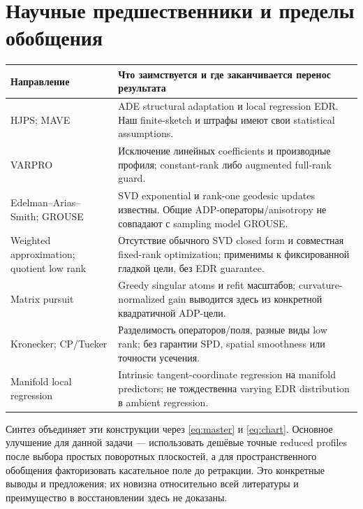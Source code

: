 \documentclass[11pt,a4paper]{article}
\begin{document}
\section{Научные предшественники и пределы обобщения}\label{sec:literature}
\begin{center}\small
\begin{tabularx}{\linewidth}{@{}p{36mm}L@{}}
\toprule
Направление & Что заимствуется и где заканчивается перенос результата\\
\midrule
HJPS; MAVE \cite{hjps,mave} &
ADE structural adaptation и local regression EDR.
Наш finite-sketch и штрафы имеют свои statistical assumptions.\\
VARPRO \cite{varpro} &
Исключение линейных coefficients и производные профиля;
constant-rank либо augmented full-rank guard.\\
Edelman--Arias--Smith; GROUSE \cite{edelman,grouse} &
SVD exponential и rank-one geodesic updates известны.
Общие ADP-операторы/anisotropy не совпадают с sampling model GROUSE.\\
Weighted approximation; quotient low rank \cite{weighted,mishra} &
Отсутствие обычного SVD closed form и совместная fixed-rank optimization;
применимы к фиксированной гладкой цели, без EDR guarantee.\\
Matrix pursuit \cite{pursuit} &
Greedy singular atoms и refit масштабов; curvature-normalized gain
выводится здесь из конкретной квадратичной ADP-цели.\\
Kronecker; CP/Tucker \cite{kron,tucker} &
Разделимость операторов/поля, разные виды low rank;
без гарантии SPD, spatial smoothness или точности усечения.\\
Manifold local regression \cite{manifold} &
Intrinsic tangent-coordinate regression на manifold predictors;
не тождественна varying EDR distribution в ambient regression.\\
\bottomrule
\end{tabularx}
\end{center}
Синтез объединяет эти конструкции через \eqref{eq:master} и
\eqref{eq:chart}. Основное улучшение для данной задачи --- использовать
дешёвые точные reduced profiles после выбора простых поворотных плоскостей,
а для пространственного обобщения факторизовать касательное поле до
ретракции. Это конкретные выводы и предложения; их новизна относительно
всей литературы и преимущество в восстановлении здесь не доказаны.
\end{document}
